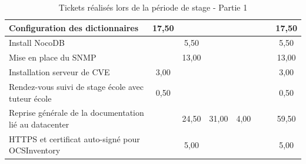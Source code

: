 \documentclass[12pt, a4paper, twoside]{article}
\begin{document}
\begin{table}[!ht]
\begin{adjustbox}{max width=\textwidth}
\begin{tabular}{|p{6cm}|c|c|c|c|c|c|c|}
        Configuration des dictionnaires & 17,50 &  &  &  &  &  & 17,50 \\ \hline
        Install NocoDB &  & 5,50 &  &  &  &  & 5,50 \\ \hline
        Mise en place du SNMP &  & 13,00 &  &  &  &  & 13,00 \\ \hline
        Installation serveur de CVE & 3,00 &  &  &  &  &  & 3,00 \\ \hline
        Rendez-vous suivi de stage école avec tuteur école & 0,50 &  &  &  &  &  & 0,50 \\ \hline
        Reprise générale de la documentation lié au datacenter &  & 24,50 & 31,00 & 4,00 &  &  & 59,50 \\ \hline
        HTTPS et certificat auto-signé pour OCSInventory &  & 5,00 &  &  &  &  & 5,00 \\ \hline
    \end{tabular}
\end{adjustbox}
\caption{Tickets réalisés lors de la période de stage - Partie 1}
\end{table}
\end{document}
